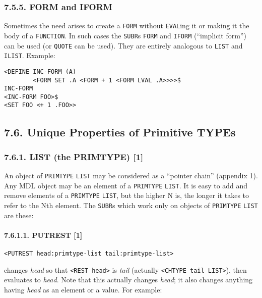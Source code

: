 \documentclass[a4paper,]{article}
\let\oldparagraph\paragraph
\renewcommand{\paragraph}[1]{\oldparagraph{#1}\mbox{}}
\begin{document}
\subsubsection{7.5.5. FORM and IFORM}\label{form-and-iform}

Sometimes the need arises to create a \texttt{FORM} without \texttt{EVAL}ing it or making it
the body of a \texttt{FUNCTION}. In such cases the \texttt{SUBR}s \texttt{FORM} and
\texttt{IFORM} (``implicit form'') can be used (or \texttt{QUOTE} can be used). They are
entirely analogous to \texttt{LIST} and \texttt{ILIST}. Example:

\begin{verbatim}
<DEFINE INC-FORM (A)
        <FORM SET .A <FORM + 1 <FORM LVAL .A>>>>$
INC-FORM
<INC-FORM FOO>$
<SET FOO <+ 1 .FOO>>
\end{verbatim}

\subsection{7.6. Unique Properties of Primitive TYPEs}\label{unique-properties-of-primitive-types}

\subsubsection{7.6.1. LIST (the PRIMTYPE) {[}1{]}}\label{list-the-primtype-1}

An object of \texttt{PRIMTYPE} \texttt{LIST} may be considered as a ``pointer chain'' (appendix
1). Any MDL object may be an element of a \texttt{PRIMTYPE} \texttt{LIST}. It is easy to add and remove elements of a
\texttt{PRIMTYPE} \texttt{LIST}, but the higher N is, the longer it takes to refer to the Nth element. The \texttt{SUBR}s
which work only on objects of \texttt{PRIMTYPE} \texttt{LIST} are these:

\paragraph{7.6.1.1. PUTREST {[}1{]}}\label{putrest-1}

\begin{verbatim}
<PUTREST head:primtype-list tail:primtype-list>
\end{verbatim}

 changes \emph{head} so that \texttt{\textless{}REST\ head\textgreater{}} is \emph{tail}
(actually \texttt{\textless{}CHTYPE\ tail\ LIST\textgreater{}}), then evaluates to \emph{head}. Note that this actually
changes \emph{head}; it also changes anything having \emph{head} as an element or a value. For example:
\end{document}
